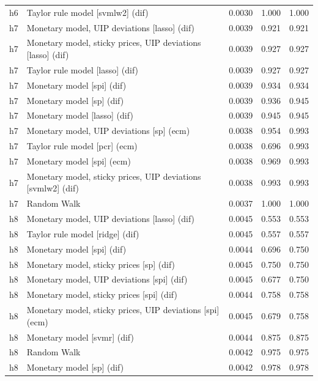 \begin{ThreePartTable}
\begin{longtable}[t]{cp{5.5cm}ccc}
h6 & \raggedright Taylor rule model [svmlw2] (dif) & 0.0030 & 1.000 & 1.000\\
\addlinespace
h7 & \raggedright Monetary model, UIP deviations [lasso] (dif) & 0.0039 & 0.921 & 0.921\\
h7 & \raggedright Monetary model, sticky prices, UIP deviations [lasso] (dif) & 0.0039 & 0.927 & 0.927\\
h7 & \raggedright Taylor rule model [lasso] (dif) & 0.0039 & 0.927 & 0.927\\
h7 & \raggedright Monetary model [spi] (dif) & 0.0039 & 0.934 & 0.934\\
h7 & \raggedright Monetary model [sp] (dif) & 0.0039 & 0.936 & 0.945\\
h7 & \raggedright Monetary model [lasso] (dif) & 0.0039 & 0.945 & 0.945\\
h7 & \raggedright Monetary model, UIP deviations [sp] (ecm) & 0.0038 & 0.954 & 0.993\\
h7 & \raggedright Taylor rule model [pcr] (ecm) & 0.0038 & 0.696 & 0.993\\
h7 & \raggedright Monetary model [spi] (ecm) & 0.0038 & 0.969 & 0.993\\
h7 & \raggedright Monetary model, sticky prices, UIP deviations [svmlw2] (dif) & 0.0038 & 0.993 & 0.993\\
h7 & \raggedright Random Walk & 0.0037 & 1.000 & 1.000\\
\addlinespace
h8 & \raggedright Monetary model, UIP deviations [lasso] (dif) & 0.0045 & 0.553 & 0.553\\
h8 & \raggedright Taylor rule model [ridge] (dif) & 0.0045 & 0.557 & 0.557\\
h8 & \raggedright Monetary model [spi] (dif) & 0.0044 & 0.696 & 0.750\\
h8 & \raggedright Monetary model, sticky prices [sp] (dif) & 0.0045 & 0.750 & 0.750\\
h8 & \raggedright Monetary model, UIP deviations [spi] (dif) & 0.0045 & 0.677 & 0.750\\
h8 & \raggedright Monetary model, sticky prices [spi] (dif) & 0.0044 & 0.758 & 0.758\\
h8 & \raggedright Monetary model, sticky prices, UIP deviations [spi] (ecm) & 0.0045 & 0.679 & 0.758\\
h8 & \raggedright Monetary model [svmr] (dif) & 0.0044 & 0.875 & 0.875\\
h8 & \raggedright Random Walk & 0.0042 & 0.975 & 0.975\\
h8 & \raggedright Monetary model [sp] (dif) & 0.0042 & 0.978 & 0.978\\

\end{longtable}
\end{ThreePartTable}
